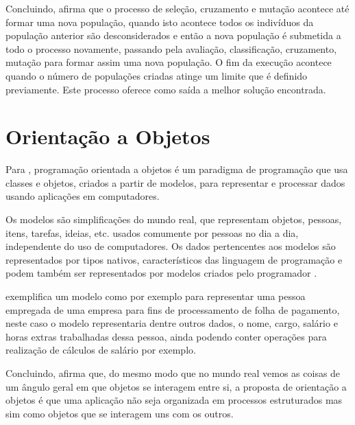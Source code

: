 \par Concluindo,  afirma que o processo de 
seleção, cruzamento e mutação acontece até formar uma nova população, 
quando isto acontece todos os indivíduos da população anterior são
desconsiderados e então a nova população é submetida a todo o processo
novamente, passando pela avaliação, classificação, cruzamento, mutação para
formar assim uma nova população. O fim da execução acontece quando o
número de populações criadas atinge um limite que é definido previamente.
Este processo oferece como saída a melhor solução encontrada.


\section{Orientação a Objetos}

\par Para ,
programação orientada a objetos é um paradigma de programação que usa
classes e objetos, criados a partir de modelos, para representar e processar
dados usando aplicações em computadores.

\par Os modelos são simplificações do mundo real, que representam
objetos, pessoas, itens, tarefas, ideias, etc. usados comumente por
pessoas no dia a dia, independente do uso de computadores. 
Os dados pertencentes aos modelos são representados por tipos nativos,
característicos das linguagem de programação e podem também ser representados
por modelos criados pelo
programador \cite{livro_intro_a_prog_orientada_objetos_usando_java}.

\par {}
exemplifica um modelo como por exemplo para representar uma pessoa empregada de
uma empresa para fins de processamento de folha de pagamento, neste caso o
modelo representaria dentre outros dados, o nome, cargo, salário e horas extras
trabalhadas dessa pessoa, ainda podendo conter operações para realização
de cálculos de salário por exemplo.


\par Concluindo,  afirma que, do mesmo modo 
que no mundo real vemos as coisas de um ângulo geral em que objetos se
interagem entre si, a proposta de orientação a objetos é que uma  
aplicação não seja organizada em processos estruturados mas
sim como objetos que se interagem uns com os outros.

